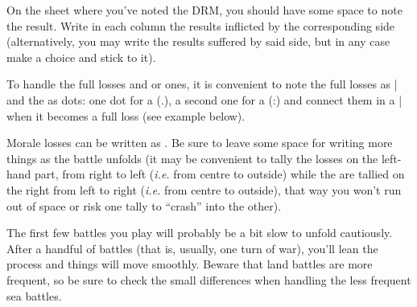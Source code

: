 \begin{playtip}
  On the sheet where you've noted the DRM, you should have some space to note
  the result. Write in each column the results inflicted by the corresponding
  side (alternatively, you may write the results suffered by said side, but in
  any case make a choice and stick to it).

  To handle the full losses and \texttu or \texttd ones, it is convenient to
  note the full losses as | and the  as dots: one dot for a \texttu
  (.), a second one for a \texttd (:) and connect them in a | when it becomes
  a full loss (see example below).

  Morale losses can be written as \textetoile. Be sure to leave some space for
  writing more things as the battle unfolds (it may be convenient to tally the
  losses on the left-hand part, from right to left (\emph{i.e.} from centre to
  outside) while the \textetoile are tallied on the right from left to right
  (\emph{i.e.} from centre to outside), that way you won't run out of space or
  risk one tally to ``crash'' into the other).

  \smallskip

  The first few battles you play will probably be a bit slow to unfold
  cautiously. After a handful of battles (that is, usually, one turn of war),
  you'll lean the process and things will move smoothly. Beware that land
  battles are more frequent, so be sure to check the small differences when
  handling the less frequent sea battles.
\end{playtip}

\newcommand{\chMilBattleRoll}[4][]{\bparag[#4.] Both sides roll for #4 of
  the #2 day. \ifx#1\relax\else At sea, the side that suffered the most
  \textetoile previously in this battle has a \bonus{-1} DRM (note that this
  is \textbf{not} necessarily the side with less Morale or less remaining
  Morale); in case of tie, nobody gets the malus.\fi #3 results.}
\newcommand{\chMilFireRoll}[3][]{\chMilBattleRoll[#1]{#2}{#3}{Fire}}
\newcommand{\chMilFireTech}{
  \bparag[Technology.] On the European map, a stack with \TREN technology and
  no \ARMY counter does not roll for Fire. A stack with \TREN technology only
  apply the \textetoile. A stack with \TARQ technology only does half (round
  down to lesser \texttu) the indicated losses. A stack with \NGD and no \VGD
  only does half (round up to larger \texttu) the indicated losses.}
\newcommand{\chMilMoraleCheck}{
  \bparag[Rout.] If one side has suffered at least as many \textetoile than
  its \terme{Morale}, it is immediately routed. It loses the battle and its
  opponent wins it. Go to~\ref{chMilitary:Battle:Pursuit}.}
\newcommand{\chMilWindAdvRetreat}{
  \bparag[Retreat.] At sea (only), the side with \terme{Wind advantage} may
  decide to retreat. If it does, it loses the battle and its opponent wins it
  but there is no pursuit. Go directly to~\ref{chMilitary:Battle:Loss
    modifications}.}
\newcommand{\chMilShockRoll}[1]{\chMilBattleRoll[t]{#1}{Tally}{Shock}}

